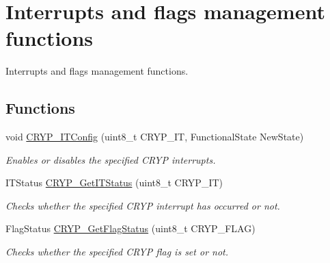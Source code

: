 \hypertarget{group___c_r_y_p___group5}{\section{Interrupts and flags management functions}
\label{group___c_r_y_p___group5}
}


Interrupts and flags management functions.  


\subsection*{Functions}
\begin{DoxyCompactItemize}
\item 
void \hyperlink{group___c_r_y_p___group5_gafbf5ee5f2c3ae4404149a994e15b33d8}{C\-R\-Y\-P\-\_\-\-I\-T\-Config} (uint8\-\_\-t C\-R\-Y\-P\-\_\-\-I\-T, Functional\-State New\-State)
\begin{DoxyCompactList}\small\item\em Enables or disables the specified C\-R\-Y\-P interrupts. \end{DoxyCompactList}\item 
I\-T\-Status \hyperlink{group___c_r_y_p___group5_ga00a48b748ed127fa517cacec9dbf18f4}{C\-R\-Y\-P\-\_\-\-Get\-I\-T\-Status} (uint8\-\_\-t C\-R\-Y\-P\-\_\-\-I\-T)
\begin{DoxyCompactList}\small\item\em Checks whether the specified C\-R\-Y\-P interrupt has occurred or not. \end{DoxyCompactList}\item 
Flag\-Status \hyperlink{group___c_r_y_p___group5_ga993d568b626a74b2973d4a6848a681f6}{C\-R\-Y\-P\-\_\-\-Get\-Flag\-Status} (uint8\-\_\-t C\-R\-Y\-P\-\_\-\-F\-L\-A\-G)
\begin{DoxyCompactList}\small\item\em Checks whether the specified C\-R\-Y\-P flag is set or not. \end{DoxyCompactList}\end{DoxyCompactItemize}


